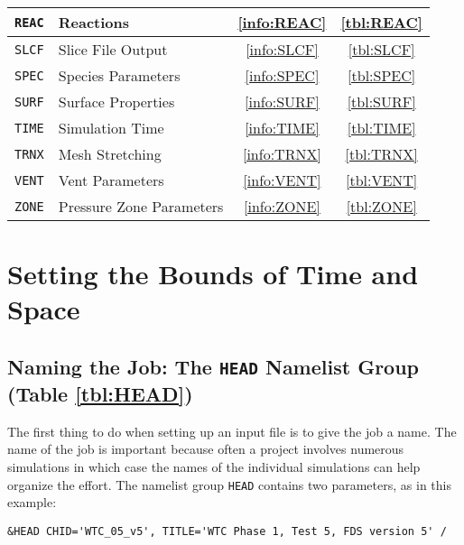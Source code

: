 \documentclass[11pt]{book}
\newcommand{\ct}{\tt\small}
\begin{document}
\begin{table}[ht]
\begin{center}
\begin{tabular}{|c|l|c|c|}
{\ct REAC}  & Reactions                    & \ref{info:REAC} & \ref{tbl:REAC}  \\ \hline
{\ct SLCF}  & Slice File Output            & \ref{info:SLCF} & \ref{tbl:SLCF}  \\ \hline
{\ct SPEC}  & Species Parameters           & \ref{info:SPEC} & \ref{tbl:SPEC}  \\ \hline
{\ct SURF}  & Surface Properties           & \ref{info:SURF} & \ref{tbl:SURF}  \\ \hline
{\ct TIME}  & Simulation Time              & \ref{info:TIME} & \ref{tbl:TIME}  \\ \hline
{\ct TRNX}  & Mesh Stretching              & \ref{info:TRNX} & \ref{tbl:TRNX}  \\ \hline
{\ct VENT}  & Vent Parameters              & \ref{info:VENT} & \ref{tbl:VENT}  \\ \hline
{\ct ZONE}  & Pressure Zone Parameters     & \ref{info:ZONE} & \ref{tbl:ZONE}  \\ \hline
\end{tabular}
\end{center}
\end{table}




\clearpage

\chapter{Setting the Bounds of Time and Space}


\section{Naming the Job: The \texorpdfstring{{\tt HEAD}}{HEAD} Namelist Group (Table \ref{tbl:HEAD})}
\label{info:HEAD}

The first thing to do when setting up an input file is to give the
job a name.  The name of the job is important because often a project
involves numerous simulations in which case the names of the individual
simulations can help organize the effort.  The namelist group {\ct HEAD} contains
two parameters, as in this example:

\footnotesize
\begin{verbatim}
&HEAD CHID='WTC_05_v5', TITLE='WTC Phase 1, Test 5, FDS version 5' /
\end{verbatim}
\normalsize
\end{document}
